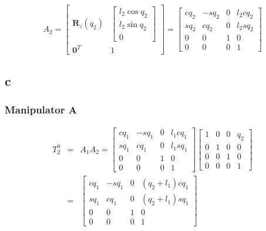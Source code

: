 \documentclass[11pt]{article}
\begin{document}
\[A_2 = 
\begin{bmatrix}
\mathbf{R}_z(q_2) & \begin{bmatrix} l_2 \cos{q_2} \\ l_2 \sin{q_2} \\ 0 \end{bmatrix} \\
\mathbf{0}^T & 1
\end{bmatrix}
=
\begin{bmatrix}
c q_2 & - s q_2 & 0 & l_2 c q_2 \\
s q_2 & c q_2 & 0 & l_2 s q_2 \\
0 & 0 & 1 & 0 \\
0 & 0 & 0 & 1
\end{bmatrix}
\]

\subsection*{c}
\subsubsection*{Manipulator A}
\begin{eqnarray*}
T^0_2 &=& A_1 A_2 = 
\begin{bmatrix}
c q_1 & - s q_1 & 0 & l_1 c q_1 \\
s q_1 & c q_1 & 0 & l_1 s q_1 \\
0 & 0 & 1 & 0 \\
0 & 0 & 0 & 1
\end{bmatrix}
\begin{bmatrix}
1 & 0 & 0 & q_2 \\
0 & 1 & 0 & 0 \\
0 & 0 & 1 & 0 \\
0 & 0 & 0 & 1
\end{bmatrix} \\
&=&
\begin{bmatrix}
c q_1 & - s q_1 & 0  & (q_2 + l_1) c q_1 \\
s q_1 & c q_1   & 0  & (q_2 + l_1) s q_1 \\
0     & 0       & 1  & 0        \\
0     & 0       & 0  & 1
\end{bmatrix}
\end{eqnarray*}
\end{document}
